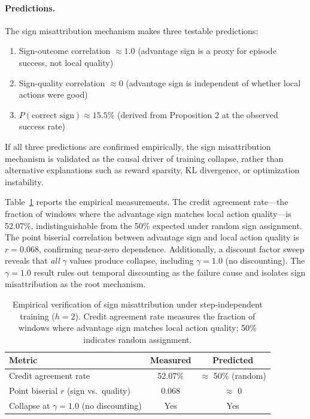 \paragraph{Predictions.}
The sign misattribution mechanism makes three testable predictions:
\begin{enumerate}
    \item Sign-outcome correlation $\approx 1.0$ (advantage sign is a proxy for episode success, not local quality)
    \item Sign-quality correlation $\approx 0$ (advantage sign is independent of whether local actions were good)
    \item $P(\text{correct sign}) \approx 15.5\%$ (derived from Proposition 2 at the observed success rate)
\end{enumerate}
If all three predictions are confirmed empirically, the sign misattribution mechanism is validated as the causal driver of training collapse, rather than alternative explanations such as reward sparsity, KL divergence, or optimization instability.

Table~\ref{tab:sign_verification} reports the empirical measurements. The credit agreement rate---the fraction of windows where the advantage sign matches local action quality---is 52.07\%, indistinguishable from the 50\% expected under random sign assignment. The point biserial correlation between advantage sign and local action quality is $r = 0.068$, confirming near-zero dependence. Additionally, a discount factor sweep reveals that \textit{all} $\gamma$ values produce collapse, including $\gamma = 1.0$ (no discounting). The $\gamma = 1.0$ result rules out temporal discounting as the failure cause and isolates sign misattribution as the root mechanism.

\begin{table}[t]
\centering
\caption{Empirical verification of sign misattribution under step-independent training ($h{=}2$). Credit agreement rate measures the fraction of windows where advantage sign matches local action quality; 50\% indicates random assignment.}
\label{tab:sign_verification}
\small
\begin{tabular}{@{}lcc@{}}
\toprule
\textbf{Metric} & \textbf{Measured} & \textbf{Predicted} \\
\midrule
Credit agreement rate & 52.07\% & $\approx$ 50\% (random) \\
Point biserial $r$ (sign vs.\ quality) & 0.068 & $\approx$ 0 \\
Collapse at $\gamma = 1.0$ (no discounting) & Yes & Yes \\
\bottomrule
\end{tabular}
\end{table}

